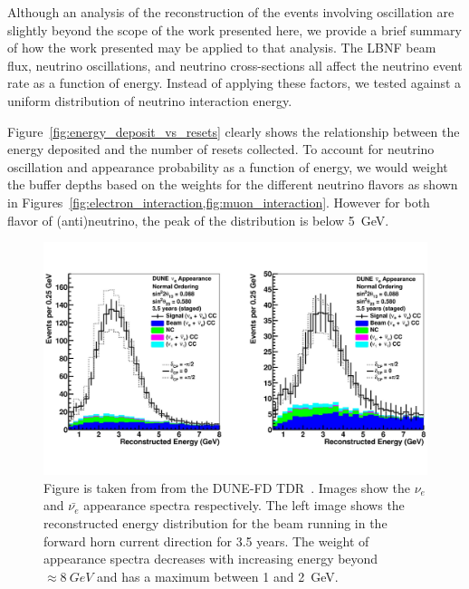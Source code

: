 Although an analysis of the reconstruction of the events involving oscillation are slightly beyond the scope of the work presented here, we provide a brief summary of how the work presented may be applied to that analysis.
The LBNF beam flux, neutrino oscillations, and neutrino cross-sections all affect the neutrino event rate as a function of energy.
Instead of applying these factors, we tested against a uniform distribution of neutrino interaction energy.

Figure~\ref{fig:energy_deposit_vs_resets} clearly shows the relationship between the energy deposited and the number of resets collected.
To account for neutrino oscillation and appearance probability as a function of energy, we would weight the buffer depths based on the weights for the different neutrino flavors as shown in Figures~\cref{fig:electron_interaction,fig:muon_interaction}.
However for both flavor of (anti)neutrino, the peak of the distribution is below 5~\unit{GeV}.

\begin{figure}[]
\centering
\includegraphics[width=\textwidth]{images/tdr_electron_reconstruction_tdrv2.pdf}
\caption{Figure is taken from from the DUNE-FD TDR~\citep{DUNE_FD_TDRv2_2020}.
Images show the $\nu_{e}$ and $\bar{\nu_{e}}$ appearance spectra respectively.
The left image shows the reconstructed energy distribution for the beam running in the forward horn current direction for 3.5 years.
The weight of appearance spectra decreases with increasing energy beyond $\approx 8~\unit{GeV}$ and has a maximum between 1 and 2~\unit{GeV}.
}
\end{figure}~\label{fig:electron_interaction}

